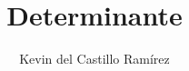 \documentclass[a4paper]{article}
\title{\textbf{Determinante}}
\author{Kevin del Castillo Ramírez}
\date{}
\begin{document}
\maketitle

\inputminted{cpp}{../../src/include/determinante.hpp}
\end{document}
